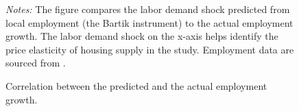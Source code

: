 \documentclass[
  12pt,
]{article}
\begin{document}
\begin{figure}


\caption{\label{fig-predicted-vs-actual-labor-demand-shock}Correlation
between the predicted and the actual employment
growth.}
\begin{minipage}{0.975\textwidth}
\small
\emph{Notes:} The figure compares
the labor demand shock predicted from local employment (the Bartik
instrument) to the actual employment growth. The labor demand shock on
the x-axis helps identify the price elasticity of housing supply in the
study. Employment data are sourced from
\citet{atlasde_2022}.
\end{minipage}


\end{figure}%
\end{document}
